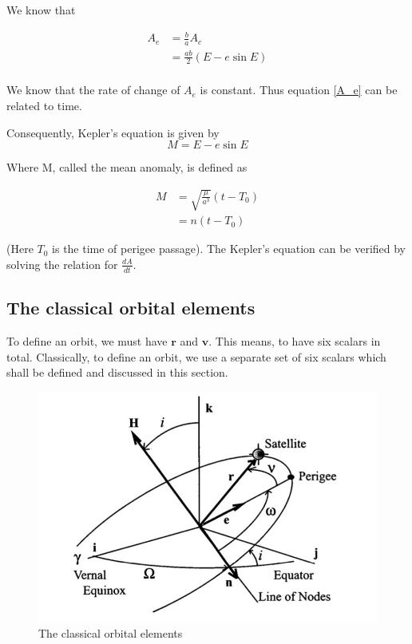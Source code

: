 \documentclass{article}
\theoremstyle{definition}
\begin{document}
We know that

\begin{equation}\label{A_e}
\begin{split}
    A_e & = \frac{b}{a}A_c\\
    & = \frac{ab}{2}(E-e\sin{E})\\
\end{split}
\end{equation}

We know that the rate of change of $A_e$ is constant. Thus equation \ref{A_e} can be related to time.

Consequently, Kepler's equation is given by 
\[M = E - e\sin{E}\]

Where M, called the mean anomaly, is defined as

\begin{equation}
\begin{split}
    M & = \sqrt{\frac{\mu}{a^3}}(t - T_0)\\
    & = n(t - T_0)
\end{split}
\end{equation}

(Here $T_0$ is the time of perigee passage). The Kepler's equation can be verified by solving the relation for $\frac{dA}{dt}$.

\subsection{The classical orbital elements}

To define an orbit, we must have $\boldsymbol{r}$ and $\boldsymbol{v}$. This means, to have six scalars in total. Classically, to define an orbit, we use a separate set of six scalars which shall be defined and discussed in this section.

\begin{figure}[h]
    \centering
    \includegraphics[scale=0.2]{image 4.jpeg}
    \caption{The classical orbital elements}
    \label{fig: classical terms}
\end{figure}
\end{document}
